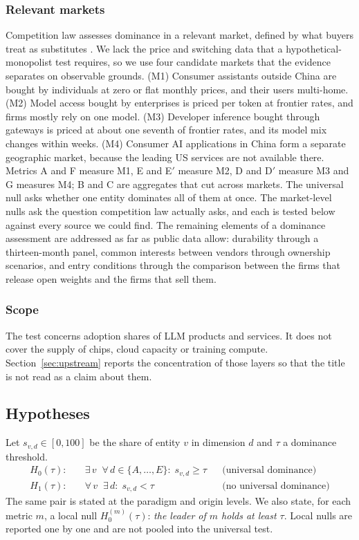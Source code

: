 \documentclass[11pt]{article}
\newcommand{\Hzero}{H_{0}}
\newcommand{\Hone}{H_{1}}
\begin{document}
\subsubsection{Relevant markets} Competition law assesses dominance in a relevant market, defined by what buyers treat as substitutes \cite{ec2009guidance,kaplow2010why}. We lack the price and switching data that a hypothetical-monopolist test requires, so we use four candidate markets that the evidence separates on observable grounds. (M1) Consumer assistants outside China are bought by individuals at zero or flat monthly prices, and their users multi-home. (M2) Model access bought by enterprises is priced per token at frontier rates, and firms mostly rely on one model. (M3) Developer inference bought through gateways is priced at about one seventh of frontier rates, and its model mix changes within weeks. (M4) Consumer AI applications in China form a separate geographic market, because the leading US services are not available there. Metrics A and F measure M1, E and E$'$ measure M2, D and D$'$ measure M3 and G measures M4; B and C are aggregates that cut across markets. The universal null asks whether one entity dominates all of them at once. The market-level nulls ask the question competition law actually asks, and each is tested below against every source we could find. The remaining elements of a dominance assessment are addressed as far as public data allow: durability through a thirteen-month panel, common interests between vendors through ownership scenarios, and entry conditions through the comparison between the firms that release open weights and the firms that sell them.

\subsubsection{Scope} The test concerns adoption shares of LLM products and services. It does not cover the supply of chips, cloud capacity or training compute. Section~\ref{sec:upstream} reports the concentration of those layers so that the title is not read as a claim about them.

\subsection{Hypotheses}

Let $s_{v,d}\in[0,100]$ be the share of entity $v$ in dimension $d$ and $\tau$ a dominance threshold.
\begin{align*}
\Hzero(\tau):\quad & \exists\, v \;\; \forall\, d\in\{A,\dots,E\}:\; s_{v,d}\ge\tau && \text{(universal dominance)}\\
\Hone(\tau):\quad & \forall\, v \;\; \exists\, d:\; s_{v,d}<\tau && \text{(no universal dominance)}
\end{align*}
The same pair is stated at the paradigm and origin levels. We also state, for each metric $m$, a local null $\Hzero^{(m)}(\tau)$: \emph{the leader of $m$ holds at least $\tau$}. Local nulls are reported one by one and are not pooled into the universal test.
\end{document}
